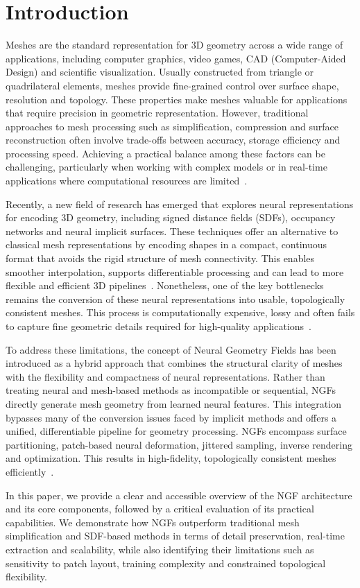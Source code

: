 \section{Introduction}\label{sec:introduction}

Meshes are the standard representation for 3D geometry across a wide range of applications, including computer graphics, video games, CAD (Computer-Aided Design) and scientific visualization.  
Usually constructed from triangle or quadrilateral elements, meshes provide fine-grained control over surface shape, resolution and topology.  
These properties make meshes valuable for applications that require precision in geometric representation.  
However, traditional approaches to mesh processing such as simplification, compression and surface reconstruction often involve trade-offs between accuracy, storage efficiency and processing speed.  
Achieving a practical balance among these factors can be challenging, particularly when working with complex models or in real-time applications where computational resources are limited~\cite{maglo2015}.  

Recently, a new field of research has emerged that explores neural representations for encoding 3D geometry, including signed distance fields (SDFs), occupancy networks and neural implicit surfaces.  
These techniques offer an alternative to classical mesh representations by encoding shapes in a compact, continuous format that avoids the rigid structure of mesh connectivity.  
This enables smoother interpolation, supports differentiable processing and can lead to more flexible and efficient 3D pipelines~\cite{park2019}.  
Nonetheless, one of the key bottlenecks remains the conversion of these neural representations into usable, topologically consistent meshes.  
This process is computationally expensive, lossy and often fails to capture fine geometric details required for high-quality applications~\cite{sivaram2024}.  

To address these limitations, the concept of Neural Geometry Fields has been introduced as a hybrid approach that combines the structural clarity of meshes with the flexibility and compactness of neural representations.  
Rather than treating neural and mesh-based methods as incompatible or sequential, NGFs directly generate mesh geometry from learned neural features.  
This integration bypasses many of the conversion issues faced by implicit methods and offers a unified, differentiable pipeline for geometry processing.  
NGFs encompass surface partitioning, patch-based neural deformation, jittered sampling, inverse rendering and optimization.  
This results in high-fidelity, topologically consistent meshes efficiently~\cite{sivaram2024}.  

In this paper, we provide a clear and accessible overview of the NGF architecture and its core components, followed by a critical evaluation of its practical capabilities.  
We demonstrate how NGFs outperform traditional mesh simplification and SDF-based methods in terms of detail preservation, real-time extraction and scalability, while also identifying their limitations such as sensitivity to patch layout, training complexity and constrained topological flexibility.  
